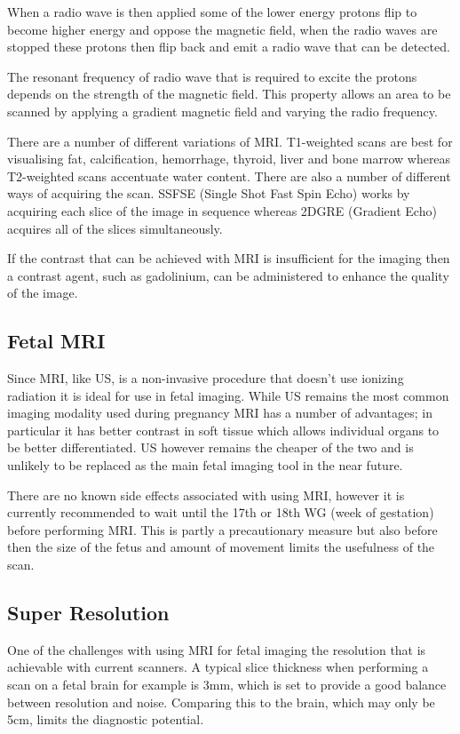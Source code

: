 \documentclass[
  oneside,
  11pt, a4paper,
  footinclude=true,
  headinclude=true,
  cleardoublepage=empty
]{scrbook}
\begin{document}
When a radio wave is then applied some of the lower energy protons flip to become higher energy and oppose the magnetic field, when the radio waves are stopped these protons then flip back and emit a radio wave that can be detected.

The resonant frequency of radio wave that is required to excite the protons depends on the strength of the magnetic field. This property allows an area to be scanned by applying a gradient magnetic field and varying the radio frequency.

There are a number of different variations of MRI. T1-weighted scans are best for visualising fat, calcification, hemorrhage, thyroid, liver and bone marrow whereas T2-weighted scans accentuate water content.
There are also a number of different ways of acquiring the scan. SSFSE (Single Shot Fast Spin Echo) works by acquiring each slice of the image in sequence whereas 2DGRE (Gradient Echo) acquires all of the slices simultaneously.

If the contrast that can be achieved with MRI is insufficient for the imaging then a contrast agent, such as gadolinium, can be administered to enhance the quality of the image.

\subsection{Fetal MRI\cite{fetalmri}}

Since MRI, like US, is a non-invasive procedure that doesn’t use ionizing radiation it is ideal for use in fetal imaging. While US remains the most common imaging modality used during pregnancy MRI has a number of advantages; in particular it has better contrast in soft tissue which allows individual organs to be better differentiated. US however remains the cheaper of the two and is unlikely to be replaced as the main fetal imaging tool in the near future.

There are no known side effects associated with using MRI, however it is currently recommended to wait until the 17th or 18th WG (week of gestation) before performing MRI. This is partly a precautionary measure but also before then the size of the fetus and amount of movement limits the usefulness of the scan.

\newpage
\subsection{Super Resolution\cite{superresolution1}\cite{superresolution2}}
One of the challenges with using MRI for fetal imaging the resolution that is achievable with current scanners. A typical slice thickness when performing a scan on a fetal brain for example is 3mm, which is set to provide a good balance between resolution and noise. Comparing this to the brain, which may only be 5cm, limits the diagnostic potential.
\end{document}
